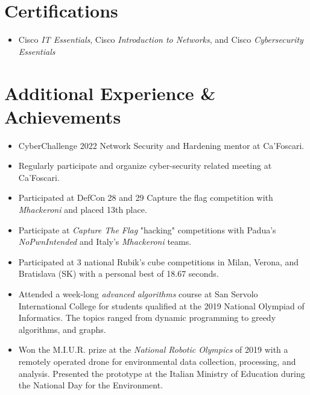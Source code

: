\documentclass[letterpaper,10pt]{article}
\newcommand{\resumeSubHeadingListEntry}[1]{\item{#1}\vspace{-5pt}}
\newcommand{\resumeSubHeadingListStart}{\begin{itemize}[leftmargin=*]}
\newcommand{\resumeSubHeadingListEnd}{\end{itemize}}
\newcommand{\shorterSection}[1]{\vspace{-10pt}\section{#1}}
\begin{document}
\shorterSection{Certifications}
  \resumeSubHeadingListStart
    \small
    \resumeSubHeadingListEntry{Cisco \textit{IT Essentials}, Cisco \textit{Introduction to Networks}, and Cisco \textit{Cybersecurity Essentials}}
  \resumeSubHeadingListEnd

\shorterSection{Additional Experience \& Achievements}
  \resumeSubHeadingListStart
    \small
    \resumeSubHeadingListEntry{CyberChallenge 2022 Network Security and Hardening mentor at Ca'Foscari.}
    \resumeSubHeadingListEntry{Regularly participate and organize cyber-security related meeting at Ca'Foscari.}
    \resumeSubHeadingListEntry{Participated at DefCon 28 and 29 Capture the flag competition with \textit{Mhackeroni} and placed 13th place.}
    \resumeSubHeadingListEntry{Participate at \textit{Capture The Flag} "hacking" competitions with Padua's \textit{NoPwnIntended} and Italy's \textit{Mhackeroni} teams.}
    \resumeSubHeadingListEntry{Participated at 3 national Rubik's cube competitions in Milan, Verona, and Bratislava (SK) with a personal best of 18.67 seconds.}
    \resumeSubHeadingListEntry{Attended a week-long \textit{advanced algorithms} course at San Servolo International College for students qualified at the 2019 National Olympiad of Informatics. The topics ranged from dynamic programming to greedy algorithms, and graphs.}
    \resumeSubHeadingListEntry{Won the M.I.U.R. prize at the \textit{National Robotic Olympics} of 2019 with a remotely operated drone for environmental data collection, processing, and analysis.  Presented the prototype at the Italian Ministry of Education during the National Day for the Environment.}
  \resumeSubHeadingListEnd
\end{document}
